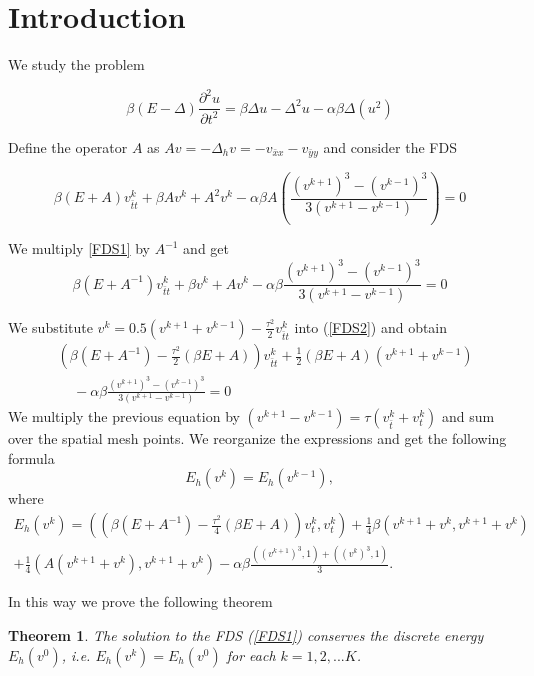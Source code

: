 \documentclass[%
 aip,
cp,  %
 amsmath,amssymb,%
 reprint,%
]{revtex4-2}
\newcommand{\be}{\begin{equation}}
\newcommand{\ee}{\end{equation}}
\newcommand{\rf}[1]{(\ref{#1})}
\newtheorem{thm}{Theorem}
\begin{document}
\section{\label{sec:level1}Introduction}
We study the problem

\be\label{problem}
\beta(E-\Delta) \frac{\partial^2 u}{\partial t^2}=
 \beta \Delta u -\Delta^2 u -\alpha \beta \Delta (u^2)
\ee

Define the operator $A$ as $Av=-\Delta_h v=-v_{\bar{x}x} - v_{\bar{y}y}$ and consider the FDS

\be\label{FDS1}
\beta (E+A)v_{\bar{t}t}^k +\beta Av^k+A^2 v^k -\alpha \beta A\left(\frac{(v^{k+1})^3-(v^{k-1})^3}{3(v^{k+1}-v^{k-1})} \right)=0
\ee

We multiply \ref{FDS1} by $A^{-1}$ and get 
\be\label{FDS2}
\beta (E+A^{-1})v_{\bar{t}t}^k +\beta v^k+A v^k -\alpha \beta \frac{(v^{k+1})^3-(v^{k-1})^3}{3(v^{k+1}-v^{k-1})} =0
\ee

We substitute $v^{k}=0.5(v^{k+1}+v^{k-1})-\frac{\tau^2}{2}v_{\bar{t}t}^k$ into \rf{FDS2}
and obtain
\begin{align*}
&\left( \beta (E+A^{-1})- \frac{\tau^2}{2}(\beta E+A ) \right)v_{\bar{t}t}^k  + \frac{1}{2} (\beta E +A )(v^{k+1}+v^{k-1}) \\
&~~~~~-\alpha \beta \frac{(v^{k+1})^3-(v^{k-1})^3}{3(v^{k+1}-v^{k-1})} =0
\end{align*}
We multiply the previous equation by $(v^{k+1}-v^{k-1})=\tau (v_{\bar{t}}^k + v_{t}^k)$ and sum over the spatial mesh points.
We reorganize the expressions and get the following formula 
\be \label{num_en}
E_h(v^k) =E_h(v^{k-1}),
\ee
where
\begin{align*}
E_h(v^k)=\left( \left( \beta (E+A^{-1})- \frac{\tau^2}{4}(\beta E+A ) \right)v_{t}^k ,v_{t}^k \right)+\frac{1}{4} \beta \left(  v^{k+1}+v^{k}, v^{k+1}+v^{k} \right) \\
+\frac{1}{4}  \left(  A(v^{k+1}+v^{k}), v^{k+1}+v^{k} \right)
-\alpha \beta \frac{((v^{k+1})^3,1)+((v^{k})^3,1)}{3}.
\end{align*}

In this way we prove the following theorem
\begin{thm}
The solution to the FDS \rf{FDS1} conserves the discrete energy
 $E_h(v^0)$, i.e.  $E_h(v^k) =E_h(v^{0})$ for each $k=1,2,...K$.
\end{thm}
\end{document}
